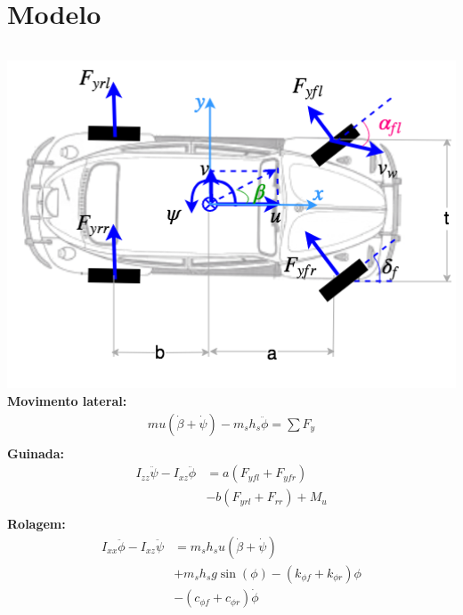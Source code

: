 \documentclass{beamer}
\begin{document}
\section{Modelo}%
 \begin{frame}[t]%

            
 \begin{columns}%
      \includegraphics[width=1\textwidth]{carmodel.png}%
      \small
 \noindent\textbf{Movimento lateral:}
 \vspace{-0.2 cm}
    \begin{equation*}    
    \begin{split}
       	mu\left(\dot{\beta} + \dot{\psi} \right) -m_sh_s\ddot{\phi} =
       	\sum{F_y}
       	\\
    \end{split}
    \end{equation*}
\vspace{-0.2 cm}
\noindent\textbf{Guinada:} 
\vspace{-0.2 cm}
    \begin{equation*}  
    \begin{split}
       I_{zz}\ddot{\psi} - I_{xz}\ddot{\phi} &= a(F_{yfl} + F_{yfr}) \\
       &- b(F_{yrl} + F_{rr}) + M_u \\
    \end{split}
    \end{equation*}
\vspace{-0.2 cm}
\noindent\textbf{Rolagem:}
\vspace{-0.2}
\begin{equation*}
\begin{split}
	I_{xx}\ddot{\phi} - I_{xz}\ddot{\psi} & =  m_sh_su(\dot{\beta} + \dot{\psi}) \\
	& + m_sh_sg\sin(\phi) - (k_{\phi f} + k_{\phi r} ) \phi \\ 
	& - ( c_{\phi f} + c_{\phi r} ) \dot{\phi} \\
 \end{split}        
\end{equation*} 
\vspace{-0.2 cm}
    \end{columns}%
\end{frame}%
\end{document}
